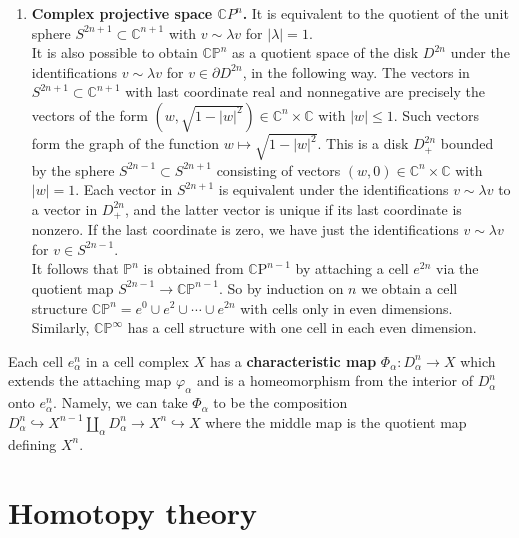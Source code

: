 \begin{example}
\begin{enumerate}
        \item \textbf{Complex projective space $\mathbb{C} P^n$.} It is equivalent to the quotient of the unit sphere $S^{2 n+1} \subset \mathbb{C}^{n+1}$ with $v \sim \lambda v$ for $|\lambda|=1$. \\
        It is also possible to obtain $\mathbb{C P}^n$ as a quotient space of the disk $D^{2 n}$ under the identifications $v \sim \lambda v$ for $v \in \partial D^{2 n}$, in the following way. The vectors in $S^{2 n+1} \subset \mathbb{C}^{n+1}$ with last coordinate real and nonnegative are precisely the vectors of the form $\left(w, \sqrt{1-|w|^2}\right) \in \mathbb{C}^n \times \mathbb{C}$ with $|w| \leq 1$. Such vectors form the graph of the function $w \mapsto \sqrt{1-|w|^2}$. This is a disk $D_{+}^{2 n}$ bounded by the sphere $S^{2 n-1} \subset S^{2 n+1}$ consisting of vectors $(w, 0) \in \mathbb{C}^n \times \mathbb{C}$ with $|w|=1$. Each vector in $S^{2 n+1}$ is equivalent under the identifications $v \sim \lambda v$ to a vector in $D_{+}^{2 n}$, and the latter vector is unique if its last coordinate is nonzero. If the last coordinate is zero, we have just the identifications $v \sim \lambda v$ for $v \in S^{2 n-1}$.\\
        It follows that $\mathbb{P}^n$ is obtained from $\mathbb{C} \mathrm{P}^{n-1}$ by attaching a cell $e^{2 n}$ via the quotient map $S^{2 n-1} \rightarrow \mathbb{C P}^{n-1}$. So by induction on $n$ we obtain a cell structure $\mathbb{C P}^n=e^0 \cup e^2 \cup \cdots \cup e^{2 n}$ with cells only in even dimensions. Similarly, $\mathbb{C P}^{\infty}$ has a cell structure with one cell in each even dimension.
    \end{enumerate}
\end{example}

Each cell $e_\alpha^n$ in a cell complex $X$ has a \textbf{characteristic map} $\Phi_\alpha: D_\alpha^n \rightarrow X$ which extends the attaching map $\varphi_\alpha$ and is a homeomorphism from the interior of $D_\alpha^n$ onto $e_\alpha^n$. Namely, we can take $\Phi_\alpha$ to be the composition $D_\alpha^n \hookrightarrow X^{n-1} \coprod_\alpha D_\alpha^n \rightarrow X^n \hookrightarrow X$ where the middle map is the quotient map defining $X^n$. 






\chapter{Homotopy theory}

